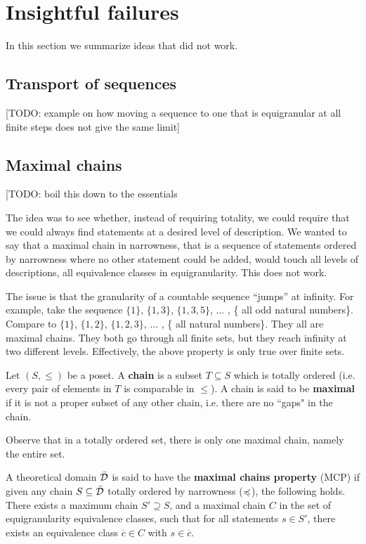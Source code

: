 \documentclass[10pt, onecolumn, nofootinbib]{revtex4-1}
\begin{document}
\section{Insightful failures}

In this section we summarize ideas that did not work.

\subsection{Transport of sequences}

[TODO: example on how moving a sequence to one that is equigranular at all finite steps does not give the same limit]

\subsection{Maximal chains}
[TODO: boil this down to the essentials

The idea was to see whether, instead of requiring totality, we could require that we could always find statements at a desired level of description. We wanted to say that a maximal chain in narrowness, that is a sequence of statements ordered by narrowness where no other statement could be added, would touch all levels of descriptions, all equivalence classes in equigranularity. This does not work.

The issue is that the granularity of a countable sequence ``jumps'' at infinity. For example, take the sequence $\{1\}$, $\{1, 3\}$, $\{1, 3, 5\}$, ... , \{ all odd natural numbers\}. Compare to $\{1\}$, $\{1, 2\}$, $\{1, 2, 3\}$, ... , \{ all natural numbers\}. They all are maximal chains. They both go through all finite sets, but they reach infinity at two different levels. Effectively, the above property is only true over finite sets.

\begin{defn}
Let $(S,\leq)$ be a poset. A \textbf{chain} is a subset $T\subseteq S$ which is totally ordered (i.e. every pair of elements in $T$ is comparable in $\leq$). A chain is said to be \textbf{maximal} if it is not a proper subset of any other chain, i.e. there are no ``gaps" in the chain. 
\end{defn}
Observe that in a totally ordered set, there is only one maximal chain, namely the entire set. 

\begin{defn}
A theoretical domain $\bar{\mathcal{D}}$ is said to have the \textbf{maximal chains property} (MCP) if given any chain $S\subseteq\bar{\mathcal{D}}$ totally ordered by narrowness ($\preccurlyeq$), the following holds. There exists a maximum chain $S'\supseteq S$, and a maximal chain $C$ in the set of equigranularity equivalence classes, such that for all statements $s \in S'$, there exists an equivalence class $\overline{c}\in C$ with $s\in \overline{c}$.
\end{defn}
\end{document}
